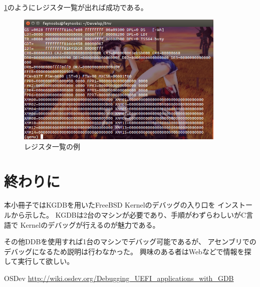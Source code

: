 \documentclass[a4j]{jarticle}
\begin{document}
\ref{fig:QEMU_REG_INFO}のようにレジスタ一覧が出れば成功である。
\begin{figure}[htbp]
	\centering
    	\includegraphics[width=10cm]{./IMG/QEMU_INFO_REGISTERS.png}
    \caption{レジスタ一覧の例}
    \label{fig:QEMU_REG_INFO}
\end{figure}

\section{終わりに}
本小冊子ではKGDBを用いたFreeBSD Kernelのデバッグの入り口を
インストールから示した。
KGDBは2台のマシンが必要であり、手順がわずらわしいがC言語で
Kernelのデバッグが行えるのが魅力である。

その他DDBを使用すれば1台のマシンでデバッグ可能であるが、
アセンブリでのデバッグになるため説明は行わなかった。
興味のある者はWebなどで情報を探して実行して欲しい。

\begin{thebibliography}{9}
		OSDev \url{http://wiki.osdev.org/Debugging_UEFI_applications_with_GDB}
\end{thebibliography}
\end{document}
